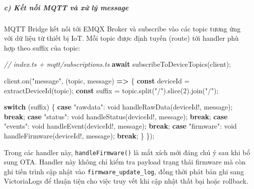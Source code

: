 \documentclass[13pt,a4paper]{extarticle}
\newenvironment{Shaded}{}{}
\newcommand{\CommentTok}[1]{\textcolor[rgb]{0.38,0.63,0.69}{\textit{#1}}}
\newcommand{\ControlFlowTok}[1]{\textcolor[rgb]{0.00,0.44,0.13}{\textbf{#1}}}
\newcommand{\DataTypeTok}[1]{\textcolor[rgb]{0.56,0.13,0.00}{#1}}
\newcommand{\DecValTok}[1]{\textcolor[rgb]{0.25,0.63,0.44}{#1}}
\newcommand{\FunctionTok}[1]{\textcolor[rgb]{0.02,0.16,0.49}{#1}}
\newcommand{\KeywordTok}[1]{\textcolor[rgb]{0.00,0.44,0.13}{\textbf{#1}}}
\newcommand{\NormalTok}[1]{#1}
\newcommand{\OperatorTok}[1]{\textcolor[rgb]{0.40,0.40,0.40}{#1}}
\newcommand{\StringTok}[1]{\textcolor[rgb]{0.25,0.44,0.63}{#1}}
\renewcommand{\\}{\thesislongtableorignewline\hline}%
\begin{document}
\subparagraph{c) Kết nối MQTT và xử lý
message}\label{c-kux1ebft-nux1ed1i-mqtt-vuxe0-xux1eed-luxfd-message}

MQTT Bridge kết nối tới EMQX Broker và subscribe vào các topic tương ứng
với dữ liệu từ thiết bị IoT. Mỗi topic được định tuyến (route) tới
handler phù hợp theo suffix của topic:

\begin{Shaded}
\begin{Highlighting}[]
\CommentTok{// index.ts + mqtt/subscriptions.ts}
\ControlFlowTok{await} \FunctionTok{subscribeToDeviceTopics}\NormalTok{(client)}\OperatorTok{;}

\NormalTok{client}\OperatorTok{.}\FunctionTok{on}\NormalTok{(}\StringTok{"message"}\OperatorTok{,}\NormalTok{ (topic}\OperatorTok{,}\NormalTok{ message) }\KeywordTok{=\textgreater{}}\NormalTok{ \{}
  \KeywordTok{const}\NormalTok{ deviceId }\OperatorTok{=} \FunctionTok{extractDeviceId}\NormalTok{(topic)}\OperatorTok{;}
  \KeywordTok{const}\NormalTok{ suffix }\OperatorTok{=}\NormalTok{ topic}\OperatorTok{.}\FunctionTok{split}\NormalTok{(}\StringTok{"/"}\NormalTok{)}\OperatorTok{.}\FunctionTok{slice}\NormalTok{(}\DecValTok{2}\NormalTok{)}\OperatorTok{.}\FunctionTok{join}\NormalTok{(}\StringTok{"/"}\NormalTok{)}\OperatorTok{;}

  \ControlFlowTok{switch}\NormalTok{ (suffix) \{}
    \ControlFlowTok{case} \StringTok{"rawdata"}\OperatorTok{:}
      \DataTypeTok{void} \FunctionTok{handleRawData}\NormalTok{(deviceId}\OperatorTok{!,}\NormalTok{ message)}\OperatorTok{;}
      \ControlFlowTok{break}\OperatorTok{;}
    \ControlFlowTok{case} \StringTok{"status"}\OperatorTok{:}
      \DataTypeTok{void} \FunctionTok{handleStatus}\NormalTok{(deviceId}\OperatorTok{!,}\NormalTok{ message)}\OperatorTok{;}
      \ControlFlowTok{break}\OperatorTok{;}
    \ControlFlowTok{case} \StringTok{"events"}\OperatorTok{:}
      \DataTypeTok{void} \FunctionTok{handleEvent}\NormalTok{(deviceId}\OperatorTok{!,}\NormalTok{ message)}\OperatorTok{;}
      \ControlFlowTok{break}\OperatorTok{;}
    \ControlFlowTok{case} \StringTok{"firmware"}\OperatorTok{:}
      \DataTypeTok{void} \FunctionTok{handleFirmware}\NormalTok{(deviceId}\OperatorTok{!,}\NormalTok{ message)}\OperatorTok{;}
      \ControlFlowTok{break}\OperatorTok{;}
\NormalTok{  \}}
\NormalTok{\})}\OperatorTok{;}
\end{Highlighting}
\end{Shaded}

Trong các handler này, \texttt{handleFirmware()} là mắt xích mới đáng
chú ý sau khi bổ sung OTA. Handler này không chỉ kiểm tra payload trạng
thái firmware mà còn ghi tiến trình cập nhật vào
\texttt{firmware\_update\_log}, đồng thời phát bản ghi sang VictoriaLogs
để thuận tiện cho việc truy vết khi cập nhật thất bại hoặc rollback.
\end{document}
